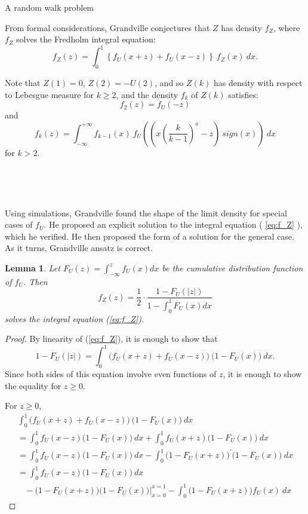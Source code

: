 \documentclass[12pt]{article}
\newtheorem*{lmm}{Lemma}
\begin{document}
\begin{section}{A random walk problem}
\

From formal considerations, Grandville conjectures that $Z$ has density $f_Z$, where $f_Z$ solves the Fredholm integral equation:
\begin{equation} \label{eq:f_Z}
f_Z(z) = \int_{0}^1 \left\{ f_U(x+z) + f_U(x-z) \right\} \ f_Z(x) \ dx .
\end{equation} 

Note that $Z(1)=0$, $Z(2) = -U(2)$, and so $Z(k)$ has density with respect to Lebesgue measure for $k \ge 2$, and the density $f_k$ of $Z(k)$ satisfies:  
$$
f_2(z) = f_U(-z)
$$
and
$$
f_k(z) = \int_{-\infty}^{+\infty} f_{k-1}(x)\ f_U\!\left(  \left(x \left(\frac{k}{k-1}\right)^a - z \right)\ sign(x) \right) \ dx  
$$
for $k > 2$.  

\

\

Using simulations, Grandville found the shape of the limit density for special cases of $f_U$. He proposed an explicit solution to the integral equation ( \ref{eq:f_Z} ), which he verified. He then proposed the form of a solution for the general case. As it turns, Grandville ansatz is correct.

\begin{lmm}{} Let $F_U(z) = \int_{-\infty}^{z} f_U(x) dx$ be the cumulative distribution function of $f_U$. Then
\begin{equation} \label{VGansatz}
f_Z(z) = \frac{1}{2} \cdot \frac{1-F_U(|z|)}{1-\int_{0}^{1} F_U(x) dx}
\end{equation}
solves the integral equation (\ref{eq:f_Z}). 

\end{lmm}

  \begin{proof} By linearity of (\ref{eq:f_Z}), it is enough to show that 
  	$$1-F_U(|z|) = \int_{0}^1 \big( f_U(x+z) + f_U(x-z) \big) \ \big(1 - F_U(x) \big) \ dx.$$ Since both sides of this equation involve even functions of $z$, it is enough to show the equality for $z \ge 0$.  
  	
  	For $z \ge 0$,
  	\begin{align*}
  	& \int_{0}^1 \big( f_U(x+z) + f_U(x-z) \big) \ \big(1 - F_U(x) \big) \ dx &\\
  	&= \int_{0}^1  f_U(x-z) \big(1 - F_U(x) \big) \ dx  + 
  	 \int_{0}^1  f_U(x+z) \big(1 - F_U(x) \big) \ dx &\\  	
  	&= \int_{0}^1  f_U(x-z) \big(1 - F_U(x) \big) \ dx 
  	- \int_{0}^1  \big( 1 - F_U(x+z) \big)^{'} \big(1 - F_U(x) \big) \ dx &\\
  	&= \int_{0}^1  f_U(x-z) \big(1 - F_U(x) \big) \ dx  &\\
  	&\ \ \ \ - \big( 1 - F_U(x+z) \big) \big(1 - F_U(x) \big) \Bigg|_{x=0}^{x=1} 
  	- \int_{0}^1  \big( 1 - F_U(x+z) \big) f_U(x)  \ dx &
  	\end{align*}  
  	

\end{proof}
\end{section}
\end{document}
